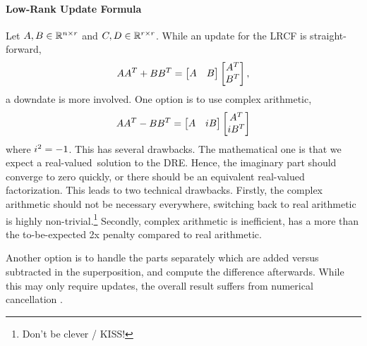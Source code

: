 
\paragraph{Low-Rank Update Formula}

Let $A, B \in\mathbb{R}^{n\times r}$ and $C, D\in\mathbb{R}^{r\times r}$.
While an update for the \ac{LRCF} is straight-forward,
\begin{equation}
  AA^T + BB^T =
  \begin{bmatrix}
    A & B
  \end{bmatrix}
  \begin{bmatrix}
    A^T \\ B^T
  \end{bmatrix}
  ,
\end{equation}
a downdate is more involved.
One option is to use complex arithmetic, \ie
\begin{equation}
  AA^T - BB^T =
  \begin{bmatrix}
    A & i B
  \end{bmatrix}
  \begin{bmatrix}
    A^T \\ i B^T
  \end{bmatrix}
\end{equation}
where $i^2=-1$.
This has several drawbacks.
The mathematical one is that we expect a real-valued\ solution to the \ac{DRE}.
Hence, the imaginary part should converge to zero quickly,
or there should be an equivalent real-valued factorization.
This leads to two technical drawbacks.
Firstly, the complex arithmetic should not be necessary everywhere,
switching back to real arithmetic is highly non-trivial.\footnote{Don't be clever / KISS!}
Secondly, complex arithmetic is inefficient, \ie has a more than the to-be-expected 2x penalty compared to real arithmetic.

Another option is to handle the parts separately which are added versus subtracted in the superposition,
and compute the difference afterwards.
While this may only require updates,
the overall result suffers from numerical cancellation
\cite[50]{Lang2015}
\cite[\pno~186, thesis~10]{Lang2017}.

